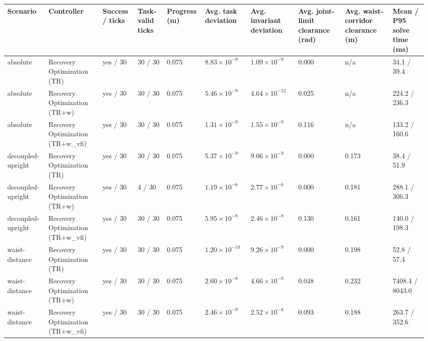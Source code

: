 \begin{tabular}{llllllllll}
\toprule
Scenario & Controller & Success / ticks & Task-valid ticks & Progress (m) & Avg. task deviation & Avg. invariant deviation & Avg. joint-limit clearance (rad) & Avg. waist-corridor clearance (m) & Mean / P95 solve time (ms) \\
\midrule
absolute & Recovery Optimization (TR) & yes / 30 & 30 / 30 & 0.075 & $8.83\times 10^{-9}$ & $1.09\times 10^{-9}$ & 0.000 & n/a & 34.1 / 39.4 \\
absolute & Recovery Optimization (TR+w) & yes / 30 & 30 / 30 & 0.075 & $5.46\times 10^{-9}$ & $4.64\times 10^{-12}$ & 0.025 & n/a & 224.2 / 236.3 \\
absolute & Recovery Optimization (TR+w\_vfi) & yes / 30 & 30 / 30 & 0.075 & $1.31\times 10^{-9}$ & $1.55\times 10^{-9}$ & 0.116 & n/a & 133.2 / 160.6 \\
decoupled-upright & Recovery Optimization (TR) & yes / 30 & 30 / 30 & 0.075 & $5.37\times 10^{-9}$ & $9.06\times 10^{-9}$ & 0.000 & 0.173 & 38.4 / 51.9 \\
decoupled-upright & Recovery Optimization (TR+w) & yes / 30 & 4 / 30 & 0.075 & $1.19\times 10^{-6}$ & $2.77\times 10^{-6}$ & 0.000 & 0.181 & 288.1 / 306.3 \\
decoupled-upright & Recovery Optimization (TR+w\_vfi) & yes / 30 & 30 / 30 & 0.075 & $5.95\times 10^{-8}$ & $2.46\times 10^{-8}$ & 0.130 & 0.161 & 140.0 / 198.3 \\
waist-distance & Recovery Optimization (TR) & yes / 30 & 30 / 30 & 0.075 & $1.20\times 10^{-10}$ & $9.26\times 10^{-9}$ & 0.000 & 0.198 & 52.8 / 57.4 \\
waist-distance & Recovery Optimization (TR+w) & yes / 30 & 30 / 30 & 0.075 & $2.60\times 10^{-8}$ & $4.66\times 10^{-8}$ & 0.048 & 0.232 & 7408.4 / 8043.0 \\
waist-distance & Recovery Optimization (TR+w\_vfi) & yes / 30 & 30 / 30 & 0.075 & $2.46\times 10^{-9}$ & $2.52\times 10^{-8}$ & 0.093 & 0.188 & 263.7 / 352.6 \\
\bottomrule
\end{tabular}
